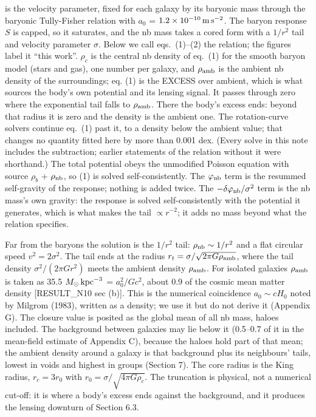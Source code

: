 \documentclass[
  10pt,
]{article}
\begin{document}
is the velocity parameter, fixed for each galaxy by its baryonic mass through the baryonic Tully-Fisher relation with $a_0$ = $1.2\times10^{-10}\,{\rm m\,s^{-2}}$. The baryon response $S$ is capped, so it saturates, and the nb mass takes a cored form with a $1/r^2$ tail and velocity parameter $\sigma$. Below we call eqs.~(1)--(2) the relation; the figures label it ``this work''. $\rho_c$ is the central nb density of eq.~(1) for the smooth baryon model (stars and gas), one number per galaxy, and $\rho_{\rm amb}$ is the ambient nb density of the surroundings; eq. (1) is the EXCESS over ambient, which is what sources the body's own potential and its lensing signal. It passes through zero where the exponential tail falls to $\rho_{\rm amb}$. There the body's excess ends: beyond that radius it is zero and the density is the ambient one. The rotation-curve solvers continue eq.~(1) past it, to a density below the ambient value; that changes no quantity fitted here by more than 0.001 dex. (Every solve in this note includes the subtraction; earlier statements of the relation without it were shorthand.) The total potential obeys the unmodified Poisson equation with source $\rho_b$ + $\rho_{\rm nb}$, so (1) is solved self-consistently. The $\varphi_{\rm nb}$ term is the resummed self-gravity of the response; nothing is added twice. The $-\delta\varphi_{\rm nb}/\sigma^2$ term is the nb mass's own gravity: the response is solved self-consistently with the potential it generates, which is what makes the tail $\propto r^{-2}$; it adds no mass beyond what the relation specifies.

Far from the baryons the solution is the $1/r^2$ tail: $\rho_{\rm nb}\sim 1/r^2$ and a flat circular speed $v^2=2\sigma^2$. The tail ends at the radius $r_t=\sigma/\sqrt{2\pi G\rho_{\rm amb}}$, where the tail density $\sigma^2/(2\pi G r^2)$ meets the ambient density $\rho_{\rm amb}$. For isolated galaxies $\rho_{\rm amb}$ is taken as 35.5 $M_\odot\,{\rm kpc}^{-3}$ = $a_0^2/Gc^2$, about 0.9 of the cosmic mean matter density {[}RESULT\_N10 sec (b){]}. This is the numerical coincidence $a_0\sim cH_0$ noted by Milgrom (1983), written as a density; we use it but do not derive it (Appendix G). The closure value is posited as the global mean of all nb mass, haloes included. The background between galaxies may lie below it (0.5--0.7 of it in the mean-field estimate of Appendix C), because the haloes hold part of that mean; the ambient density around a galaxy is that background plus its neighbours' tails, lowest in voids and highest in groups (Section 7). The core radius is the King radius, $r_c=3r_0$ with $r_0=\sigma/\sqrt{4\pi G\rho_c}$. The truncation is physical, not a numerical cut-off: it is where a body's excess ends against the background, and it produces the lensing downturn of Section 6.3.
\end{document}
